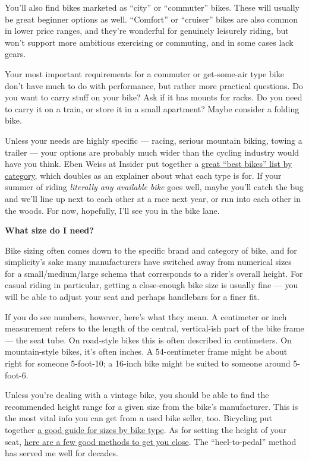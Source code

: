 You'll also find bikes marketed as ``city'' or ``commuter'' bikes. These
will usually be great beginner options as well. ``Comfort'' or
``cruiser'' bikes are also common in lower price ranges, and they're
wonderful for genuinely leisurely riding, but won't support more
ambitious exercising or commuting, and in some cases lack gears.

Your most important requirements for a commuter or get-some-air type
bike don't have much to do with performance, but rather more practical
questions. Do you want to carry stuff on your bike? Ask if it has mounts
for racks. Do you need to carry it on a train, or store it in a small
apartment? Maybe consider a folding bike.

Unless your needs are highly specific --- racing, serious mountain
biking, towing a trailer --- your options are probably much wider than
the cycling industry would have you think. Eben Weiss at Insider put
together a \href{https://www.insider.com/best-bikes}{great ``best
bikes'' list by category}, which doubles as an explainer about what each
type is for. If your summer of riding \emph{literally any available
bike} goes well, maybe you'll catch the bug and we'll line up next to
each other at a race next year, or run into each other in the woods. For
now, hopefully, I'll see you in the bike lane.

\textbf{What size do I need?}

Bike sizing often comes down to the specific brand and category of bike,
and for simplicity's sake many manufacturers have switched away from
numerical sizes for a small/medium/large schema that corresponds to a
rider's overall height. For casual riding in particular, getting a
close-enough bike size is usually fine --- you will be able to adjust
your seat and perhaps handlebars for a finer fit.

If you do see numbers, however, here's what they mean. A centimeter or
inch measurement refers to the length of the central, vertical-ish part
of the bike frame --- the seat tube. On road-style bikes this is often
described in centimeters. On mountain-style bikes, it's often inches. A
54-centimeter frame might be about right for someone 5-foot-10; a
16-inch bike might be suited to someone around 5-foot-6.

Unless you're dealing with a vintage bike, you should be able to find
the recommended height range for a given size from the bike's
manufacturer. This is the most vital info you can get from a used bike
seller, too. Bicycling put together
\href{https://www.bicycling.com/bikes-gear/a20047780/find-right-bike-size/)}{a
good guide for sizes by bike type}. As for setting the height of your
seat,
\href{https://roadcyclinguk.com/how-to/technique/beginners-guide-how-to-set-your-saddle-height-on-a-road-bike.html}{here
are a few good methods to get you close}. The ``heel-to-pedal'' method
has served me well for decades.

